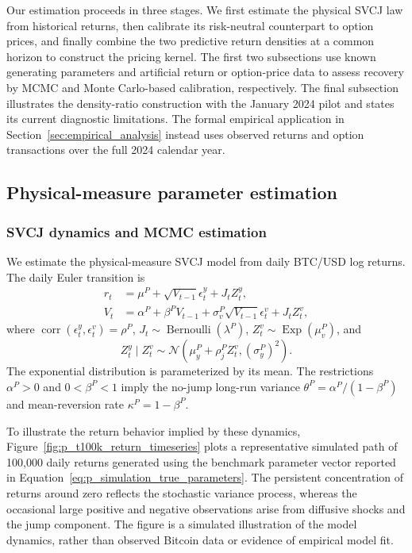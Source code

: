 Our estimation proceeds in three stages. We first estimate the physical SVCJ
law from historical returns, then calibrate its risk-neutral counterpart to
option prices, and finally combine the two predictive return densities at a
common horizon to construct the pricing kernel. The first two subsections
use known generating parameters and artificial return or option-price data
to assess recovery by MCMC and Monte Carlo-based calibration, respectively.
The final subsection illustrates the density-ratio construction with the
January 2024 pilot and states its current diagnostic limitations. The formal
empirical application in Section~\ref{sec:empirical_analysis} instead uses
observed returns and option transactions over the full 2024 calendar year.

\subsection{Physical-measure parameter estimation}
\label{subsec:p_parameter_estimation}

\subsubsection{SVCJ dynamics and MCMC estimation}
\label{subsubsec:p_svcj_mcmc}

We estimate the physical-measure SVCJ model from daily BTC/USD log returns.
The daily Euler transition is
\begin{align}
r_t &= \mu^P+\sqrt{V_{t-1}}\epsilon^y_t+J_t Z^y_t,
\label{eq:p_svcj_return}\\
V_t &= \alpha^P+\beta^P V_{t-1}
      +\sigma_v^P\sqrt{V_{t-1}}\epsilon^v_t+J_t Z^v_t,
\label{eq:p_svcj_variance}
\end{align}
where $\operatorname{corr}(\epsilon^y_t,\epsilon^v_t)=\rho^P$,
$J_t\sim\operatorname{Bernoulli}(\lambda^P)$,
$Z^v_t\sim\operatorname{Exp}(\mu_v^P)$, and
\begin{equation}
Z^y_t\mid Z^v_t
\sim\mathcal{N}\!\left(\mu_y^P+\rho_j^P Z^v_t,
                        (\sigma_y^P)^2\right).
\end{equation}
The exponential distribution is parameterized by its mean. The restrictions
$\alpha^P>0$ and $0<\beta^P<1$ imply the no-jump long-run variance
$\theta^P=\alpha^P/(1-\beta^P)$ and mean-reversion rate
$\kappa^P=1-\beta^P$.

{\color{red}
To illustrate the return behavior implied by these dynamics,
Figure~\ref{fig:p_t100k_return_timeseries} plots a representative simulated
path of 100,000 daily returns generated using the benchmark parameter vector
reported in Equation~\eqref{eq:p_simulation_true_parameters}. The persistent
concentration of returns around zero reflects the stochastic variance process,
whereas the occasional large positive and negative observations arise from
diffusive shocks and the jump component. The figure is a simulated
illustration of the model dynamics, rather than observed Bitcoin data or
evidence of empirical model fit.
}

